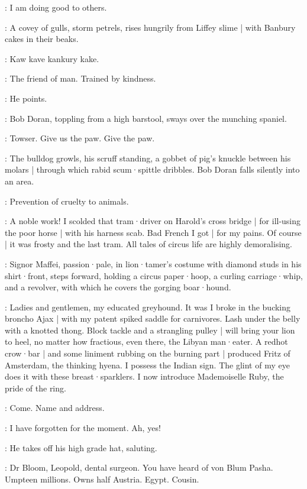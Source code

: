 \Bloom:
I am doing good to others.

:
A covey of gulls,
storm petrels,
rises hungrily from Liffey slime |
with Banbury cakes in their beaks.

\Gulls:
Kaw kave kankury kake.

\Bloom:
The friend of man.
Trained by kindness.

:
He points.

:
Bob Doran,
toppling from a high barstool,
sways over the munching spaniel.%

\Doran:
Towser.
Give us the paw.
Give the paw.

:
The bulldog growls,
his scruff standing,
a gobbet of pig's knuckle between his molars |
through which rabid scum·spittle dribbles.
Bob Doran falls silently into an area.

\SecondWatch[2]:
Prevention of cruelty to animals.

\Bloom:
A noble work!
I scolded that tram·driver on Harold's cross bridge |
for ill-using the poor horse |
with his harness scab.
Bad French I got |
for my pains.
Of course |
it was frosty and the last tram.
All tales of circus life are highly demoralising.

:
Signor Maffei,
passion·pale,
in lion·tamer's costume with diamond studs in his shirt·front,
steps forward,
holding a circus paper·hoop,
a curling carriage·whip,
and a revolver,
with which he covers the gorging boar·hound.

\Maffei:
Ladies and gentlemen,
my educated greyhound.
It was I broke in the bucking broncho Ajax |
with my patent spiked saddle for carnivores.
Lash under the belly with a knotted thong.
Block tackle and a strangling pulley |
will bring your lion to heel,
no matter how fractious,
even  there,
the Libyan man·eater.
A redhot crow·bar |
and some liniment rubbing on the burning part |
produced Fritz of Amsterdam,
the thinking hyena.
I possess the Indian sign.
The glint of my eye does it with these breast·sparklers.
I now introduce Mademoiselle Ruby,
the pride of the ring.

\FirstWatch[1]:
Come.
Name and address.

\Bloom:
I have forgotten for the moment.
Ah,
yes!

:
He takes off his high grade hat,
saluting.

\Bloom:
Dr Bloom,
Leopold,
dental surgeon.
You have heard of von Blum Pasha.
Umpteen millions.
Owns half Austria.
Egypt.
Cousin.

